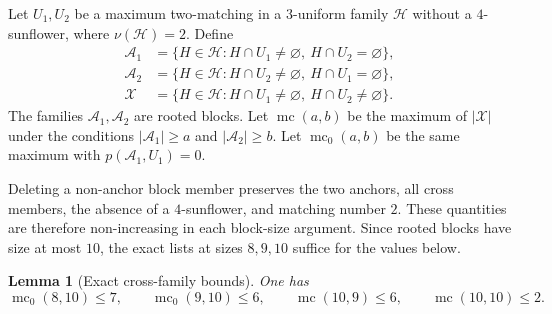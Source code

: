 \documentclass[11pt]{article}
\numberwithin{equation}{section}
\newtheorem{lemma}[lemma]{Lemma}
\theoremstyle{definition}
\theoremstyle{remark}
\newcommand{\A}{\mathcal A}
\newcommand{\X}{\mathcal X}
\newcommand{\mc}{\operatorname{mc}}
\newcommand{\mcz}{\operatorname{mc}_0}
\begin{document}
Let $U_1,U_2$ be a maximum two-matching in a $3$-uniform family $\mathcal H$
without a $4$-sunflower, where $\nu(\mathcal H)=2$. Define
\begin{align*}
 \A_1&=\{H\in\mathcal H:H\cap U_1\ne\varnothing,
                         \ H\cap U_2=\varnothing\},\\
 \A_2&=\{H\in\mathcal H:H\cap U_2\ne\varnothing,
                         \ H\cap U_1=\varnothing\},\\
 \X&=\{H\in\mathcal H:H\cap U_1\ne\varnothing,
                       \ H\cap U_2\ne\varnothing\}.
\end{align*}
The families $\A_1,\A_2$ are rooted blocks. Let $\mc(a,b)$ be the maximum
of $|\X|$ under the conditions $|\A_1|\ge a$ and $|\A_2|\ge b$. Let
$\mcz(a,b)$ be the same maximum with $p(\A_1,U_1)=0$.

Deleting a non-anchor block member preserves the two anchors, all cross
members, the absence of a $4$-sunflower, and matching number $2$. These
quantities are therefore non-increasing in each block-size argument. Since
rooted blocks have size at most $10$, the exact lists at sizes $8,9,10$
suffice for the values below.

\begin{lemma}[Exact cross-family bounds]
\label{lem:f34-cross-bounds}
One has
\begin{equation}
 \mcz(8,10)\le7,
 \qquad
 \mcz(9,10)\le6,
 \qquad
 \mc(10,9)\le6,
 \qquad
 \mc(10,10)\le2.
 \label{eq:f34-cross-bounds}
\end{equation}
\end{lemma}
\end{document}
